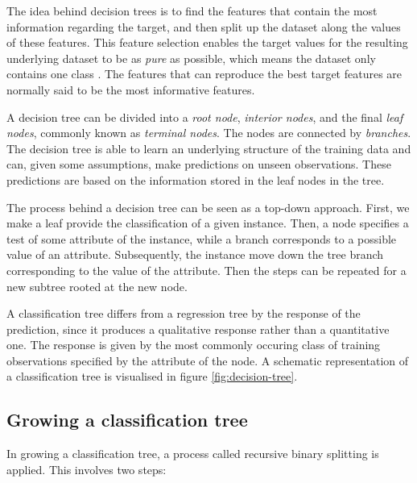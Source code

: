 The idea behind decision trees is to find the features that contain the most information regarding the target, and then split up the dataset along the values of these features. This feature selection enables the target values for the resulting underlying dataset to be as \textit{pure} as possible, which means the dataset only contains one class \cite{Murphy2012}. The features that can reproduce the best target features are normally said to be the most informative features.

A decision tree can be divided into a \textit{root node}, \textit{interior nodes}, and the final \textit{leaf nodes}, commonly known as \textit{terminal nodes}. The nodes are connected by \textit{branches}. The decision tree is able to learn an underlying structure of the training data and can, given some assumptions, make predictions on unseen observations. These predictions are based on the information stored in the leaf nodes in the tree.


\noindent The process behind a decision tree can be seen as a top-down approach. First, we make a leaf provide the classification of a given instance. Then, a node specifies a test of some attribute of the instance, while a branch corresponds to a possible value of an attribute. Subsequently, the instance move down the tree branch corresponding to the value of the attribute. Then the steps can be repeated for a new subtree rooted at the new node.

A classification tree differs from a regression tree by the response of the prediction, since it produces a qualitative response rather than a quantitative one. The response is given by the most commonly occuring class of training observations specified by the attribute of the node. A schematic representation of a classification tree is visualised in figure \ref{fig:decision-tree}. %

\subsection{Growing a classification tree}

In growing a classification tree, a process called recursive binary splitting is applied. This involves two steps:

